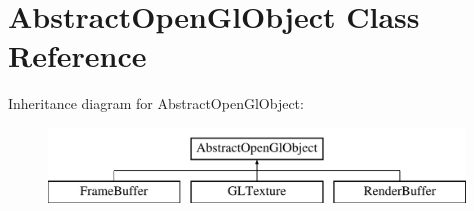 \hypertarget{class_abstract_open_gl_object}{\section{Abstract\-Open\-Gl\-Object Class Reference}
\label{class_abstract_open_gl_object}
}
Inheritance diagram for Abstract\-Open\-Gl\-Object\-:\begin{figure}[H]
\begin{center}
\leavevmode
\includegraphics[height=2.000000cm]{class_abstract_open_gl_object}
\end{center}
\end{figure}
